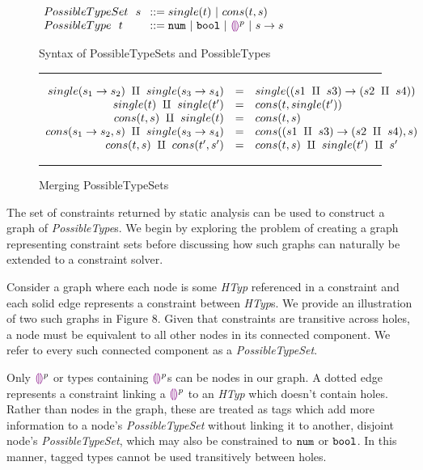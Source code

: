 \begin{figure}[htbp]
\centering
\vspace{-3px} 
$\arraycolsep=4pt\begin{array}{lll}
PossibleTypeSet~~ s & ::= 
single(t) ~\vert~ 
cons(t, s)
\\
PossibleType~~ t & ::= 
  \tnum ~\vert~
  \tbool ~\vert~
  \ehole^p ~\vert~
  \tarr{s}{s}
  \\
\end{array}$
\caption{Syntax of PossibleTypeSets and PossibleTypes}
\vspace{5px} 
\hrule
\[\begin{array}{rcl}
    single(s_1 \rightarrow s_2) ~\amalg~ single(s_3 \rightarrow s_4) & = & single({(s1 ~\amalg~ s3) \rightarrow (s2 ~\amalg~ s4)}) \\
    single(t) ~\amalg~ single(t') & = & cons(t, single(t')) \\
    cons(t,s) ~\amalg~ single(t) & = & cons(t, s) \\
    cons(s_1 \rightarrow s_2, s) ~\amalg~ single(s_3 \rightarrow s_4) & = & cons((s1 ~\amalg~ s3) \rightarrow (s2 ~\amalg~ s4) , s) \\
    cons(t,s) ~\amalg~ cons(t',s') & = & cons(t,s) ~\amalg~ single(t') ~\amalg~ s' \\
\end{array}\] 
\caption{Merging PossibleTypeSets}
\vspace{5px} 
\hrule
\label{fig:syntax_fig}
\vspace{-5px}
\end{figure}

 The set of constraints returned by static analysis can be used to construct a graph of \textit{PossibleType}s. We begin by exploring the problem of creating a graph representing constraint sets before discussing how such graphs can naturally be extended to a constraint solver. 
 
 Consider a graph where each node is some \textit{HTyp} referenced in a constraint and each solid edge represents a constraint between \textit{HTyp}s. We provide an illustration of two such graphs in Figure 8. Given that constraints are transitive across holes, a node must be equivalent to all other nodes in its connected component. We refer to every such connected component as a \textit{PossibleTypeSet}. 

Only $\textcolor{violet}{\llparenthesis}\textcolor{violet}{\rrparenthesis}^{p}$ or types containing $\textcolor{violet}{\llparenthesis}\textcolor{violet}{\rrparenthesis}^{p}$s can be nodes in our graph. A dotted edge represents a constraint linking a $\textcolor{violet}{\llparenthesis}\textcolor{violet}{\rrparenthesis}^{p}$ to an \textit{HTyp} which doesn't contain holes. Rather than nodes in the graph, these are treated as tags which add more information to a node's \textit{PossibleTypeSet} without linking it to another, disjoint node's \textit{PossibleTypeSet}, which may also be constrained to $\mathtt{num}$ or $\mathtt{bool}$. In this manner, tagged types cannot be used transitively between holes.

